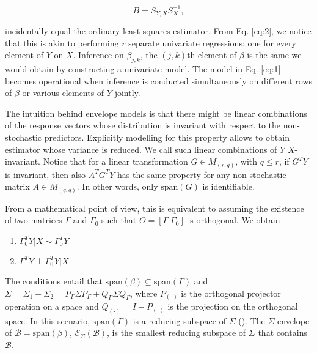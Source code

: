 \documentclass[graybox]{svmult}
\begin{document}
\begin{equation}
  \label{eq:2}
  B = S_{Y, X}S_X^{-1},
\end{equation}

incidentally equal the ordinary least squares estimator. From Eq.
\ref{eq:2}, we notice that this is akin to performing $r$ separate
univariate regressions: one for every element of $Y$ on $X$. Inference
on $\beta_{j,k}$, the $\left( j, k \right)$th element of $\beta$ is
the same we would obtain by constructing a univariate model. The model
in Eq. \ref{eq:1} becomes operational when inference is conducted
simultaneously on different rows of $\beta$ or various elements of $Y$
jointly.

The intuition behind envelope models is that there might be linear
combinations of the response vectors whose distribution is invariant
with respect to the non-stochastic predictors. Explicitly modelling
for this property allows to obtain estimator whose variance is
reduced. We call such linear combinations of $Y$ $X$-invariant. Notice
that for a linear transformation $G \in M_{\left( r, q \right)}$, with
$q \leq r$, if $G^T Y$ is invariant, then also $A^T G^T Y$ has the
same property for any non-stochastic matrix
$A \in M_{\left( q, q \right)}$. In other words, only
$\mathrm{span}\left( G \right)$ is identifiable.

From a mathematical point of view, this is equivalent to assuming the
existence of two matrices $\Gamma$ and $\Gamma_0$ such that
$O = \left[ \Gamma \;  \Gamma_0 \right]$ is orthogonal. We obtain

\begin{enumerate}
\item $\Gamma_0^T Y | X \sim \Gamma_0^T Y$
\item $\Gamma^T Y \perp \Gamma_0^T Y | X$
\end{enumerate}

The conditions entail that
$\mathrm{span}\left( \beta \right) \subseteq \mathrm{span}\left(
  \Gamma \right)$ and
$\Sigma = \Sigma_1 + \Sigma_2 = P_{\Gamma}\Sigma P_{\Gamma} +
Q_{\Gamma} \Sigma Q_{\Gamma}$, where $P_{\left(\cdot\right)}$ is the
orthogonal projector operation on a space and
$Q_{\left(\cdot\right)} = I - P_{\left(\cdot\right)}$ is the
projection on the orthogonal space. In this scenario,
$\mathrm{span}\left( \Gamma \right)$ is a reducing subspace of
$\Sigma$ (\cite{cookENVELOPEMODELSPARSIMONIOUS2010}). The $\Sigma$-envelope of $\mathcal{B} = \mathrm{span}\left( \beta \right)$, $\mathcal{E}_{\Sigma} \left( \mathcal{B} \right)$, is the smallest reducing subspace of $\Sigma$ that contains $\mathcal{B}$.
\end{document}
